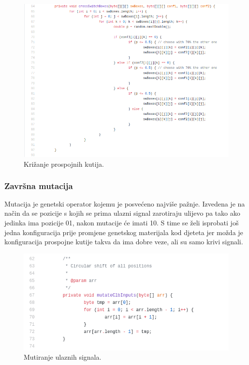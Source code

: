 \documentclass[times, utf8, zavrsni]{fer}
\begin{document}
\begin{figure}[H]
	\centering
	\includegraphics[width=18cm]{slike/crossSwBoxes.png}
	\caption{Križanje prospojnih kutija.}
	\label{fig:sw-boxes-crossing}
\end{figure} 

\subsubsection{Završna mutacija}
\label{EndMutation}

Mutacija je genetski operator kojemu je posvećeno najviše pažnje. Izvedena je na način da se pozicije s kojih se prima ulazni signal zarotiraju ulijevo pa tako ako jedinka ima pozicije 01, nakon mutacije će imati 10. S time se želi isprobati još jedna konfiguracija prije promjene genetskog materijala kod djeteta jer možda je konfiguracija prospojne kutije takva da ima dobre veze, ali su samo krivi signali.  

\begin{figure}[H]
	\centering
	\includegraphics[width=18cm]{slike/circularShift.png}
	\caption{Mutiranje ulaznih signala.}
	\label{fig:sw-boxes-inputs-mutation}
\end{figure} 
\end{document}
